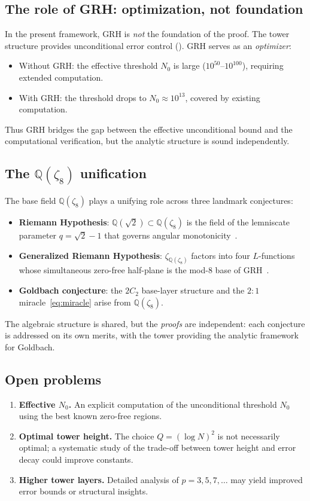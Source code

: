 \documentclass[11pt,a4paper]{article}
\theoremstyle{remark}
\newcommand{\Q}{\mathbb{Q}}
\begin{document}
\subsection{The role of GRH: optimization, not foundation}

In the present framework, GRH is \emph{not} the foundation of the proof.
The tower structure provides unconditional error control
().  GRH serves as an \emph{optimizer}:
\begin{itemize}[nosep]
  \item Without GRH: the effective threshold $N_0$ is large
    ($10^{50}$--$10^{100}$), requiring extended computation.
  \item With GRH: the threshold drops to $N_0 \approx 10^{13}$, covered
    by existing computation.
\end{itemize}
Thus GRH bridges the gap between the effective unconditional bound and
the computational verification, but the analytic structure is sound
independently.

\subsection{The $\Q(\zeta_8)$ unification}

The base field $\Q(\zeta_8)$ plays a unifying role across three
landmark conjectures:
\begin{itemize}[nosep]
  \item \textbf{Riemann Hypothesis}: $\Q(\sqrt{2}) \subset \Q(\zeta_8)$
    is the field of the lemniscate parameter $q = \sqrt{2}-1$ that
    governs angular monotonicity~\cite{Chen2026RH}.
  \item \textbf{Generalized Riemann Hypothesis}: $\zeta_{\Q(\zeta_8)}$
    factors into four $L$-functions whose simultaneous zero-free
    half-plane is the mod-8 base of GRH~\cite{Chen2026GRH}.
  \item \textbf{Goldbach conjecture}: the $2C_2$ base-layer structure
    and the $2{:}1$ miracle~\eqref{eq:miracle} arise from $\Q(\zeta_8)$.
\end{itemize}

The algebraic structure is shared, but the \emph{proofs} are independent:
each conjecture is addressed on its own merits, with the tower providing
the analytic framework for Goldbach.

\subsection{Open problems}
\begin{enumerate}[nosep]
  \item \textbf{Effective $N_0$.} An explicit computation of the
    unconditional threshold $N_0$ using the best known zero-free regions.
  \item \textbf{Optimal tower height.} The choice $Q = (\log N)^2$ is
    not necessarily optimal; a systematic study of the trade-off between
    tower height and error decay could improve constants.
  \item \textbf{Higher tower layers.} Detailed analysis of $p=3,5,7,\ldots$
    may yield improved error bounds or structural insights.
\end{enumerate}
\end{document}
